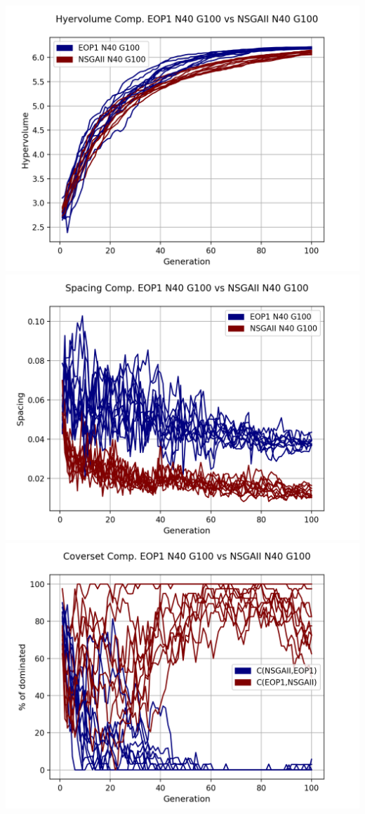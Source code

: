 \begin{center}
\includegraphics[scale=0.35]{../METRICS_PLOTS/Hypervol_COMP_EOP1N40G100_NSGAIIN40G100.png}
\includegraphics[scale=0.35]{../METRICS_PLOTS/Spacing_COMP_EOP1N40G100_NSGAIIN40G100.png}
\includegraphics[scale=0.35]{../METRICS_PLOTS/CoverSet_COMP_EOP1N40G100_NSGAIIN40G100.png}\\

\end{center}
